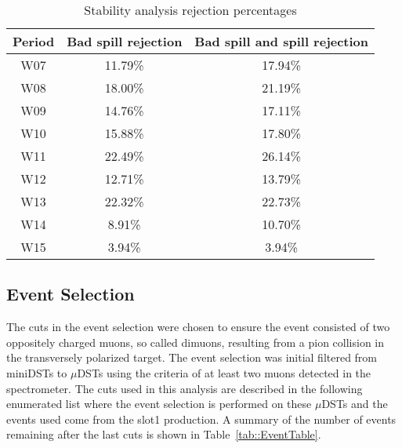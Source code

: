 \begin{table}[h!t]
  \centering
  \label{tab::badspillpercent}
  \caption{Stability analysis rejection percentages}
  \begin{tabular}{ |c|c|c| }
    \hline \textbf{Period}& \textbf{Bad spill rejection}&
    \textbf{Bad spill and spill rejection} \\ \hline \hline
    
    W07& 11.79\%& 17.94\%\\ \hline
    W08& 18.00\%& 21.19\%\\ \hline
    W09& 14.76\%& 17.11\%\\ \hline
    W10& 15.88\%& 17.80\%\\ \hline
    W11& 22.49\%& 26.14\%\\ \hline
    W12& 12.71\%& 13.79\%\\ \hline
    W13& 22.32\%& 22.73\%\\ \hline
    W14& 8.91\%& 10.70\%\\ \hline
    W15& 3.94\%& 3.94\%\\ \hline

  \end{tabular}
\end{table}

\subsection{Event Selection}
The cuts in the event selection were chosen to ensure the event consisted of two
oppositely charged muons, so called dimuons, resulting from a pion collision in
the transversely polarized target.  The event selection was initial filtered
from miniDSTs to $\mu$DSTs using the criteria of at least two muons detected in
the spectrometer.  The cuts used in this analysis are described in the following
enumerated list where the event selection is performed on these $\mu$DSTs and
the events used come from the slot1 production.  A summary of the number of
events remaining after the last cuts is shown in Table~\ref{tab::EventTable}.

